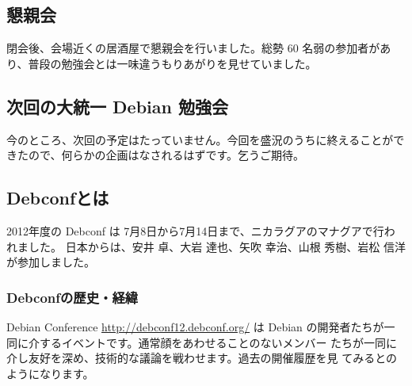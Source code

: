 \documentclass[mingoth,a4paper]{jsarticle}
\begin{document}
\subsection{懇親会}

閉会後、会場近くの居酒屋で懇親会を行いました。総勢 60 名弱の参加者があり、普段の勉強会とは一味違うもりあがりを見せていました。

\subsection{次回の大統一 Debian 勉強会}

今のところ、次回の予定はたっていません。今回を盛況のうちに終えることができたので、何らかの企画はなされるはずです。乞うご期待。


\label{sec:debconfreportsummary}

\subsection{Debconfとは}

2012年度の Debconf は 7月8日から7月14日まで、ニカラグアのマナグアで行われました。
日本からは、安井 卓、大岩 達也、矢吹 幸治、山根 秀樹、岩松 信洋が参加しました。

\subsubsection{Debconfの歴史・経緯}

Debian Conference \url{http://debconf12.debconf.org/} は Debian 
の開発者たちが一同に介するイベントです。通常顔をあわせることのないメンバー
たちが一同に介し友好を深め、技術的な議論を戦わせます。過去の開催履歴を見
てみるとのようになります。
\end{document}
